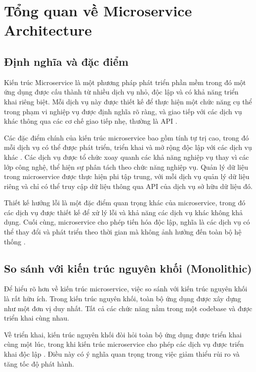 \section{Tổng quan về Microservice Architecture}

\subsection{Định nghĩa và đặc điểm}
Kiến trúc Microservice là một phương pháp phát triển phần mềm trong đó một ứng
dụng được cấu thành từ nhiều dịch vụ nhỏ, độc lập và có khả năng triển khai
riêng biệt. Mỗi dịch vụ này được thiết kế để thực hiện một chức năng cụ thể
trong phạm vi nghiệp vụ được định nghĩa rõ ràng, và giao tiếp với các dịch vụ
khác thông qua các cơ chế giao tiếp nhẹ, thường là API \cite{fowler2014}.

Các đặc điểm chính của kiến trúc microservice bao gồm tính tự trị cao, trong đó mỗi dịch vụ có thể được phát triển, triển khai và mở rộng độc lập với các dịch vụ khác \cite{newman2015}. Các dịch vụ được tổ chức xoay quanh các khả năng
nghiệp vụ thay vì các lớp công nghệ, thể hiện sự phân tách theo chức năng
nghiệp vụ. Quản lý dữ liệu trong microservice được thực hiện phi tập trung, với
mỗi dịch vụ quản lý dữ liệu riêng và chỉ có thể truy cập dữ liệu thông qua API
của dịch vụ sở hữu dữ liệu đó.

Thiết kế hướng lỗi là một đặc điểm quan trọng khác của microservice, trong đó
các dịch vụ được thiết kế để xử lý lỗi và khả năng các dịch vụ khác không khả
dụng. Cuối cùng, microservice cho phép tiến hóa độc lập, nghĩa là các dịch vụ
có thể thay đổi và phát triển theo thời gian mà không ảnh hưởng đến toàn bộ hệ
thống \cite{richardson2019}.

\subsection{So sánh với kiến trúc nguyên khối (Monolithic)}
Để hiểu rõ hơn về kiến trúc microservice, việc so sánh với kiến trúc nguyên khối là rất hữu ích. Trong kiến trúc nguyên khối, toàn bộ ứng dụng được xây dựng như một đơn vị duy nhất. Tất cả các chức năng nằm trong một codebase và được triển khai cùng nhau.

Về triển khai, kiến trúc nguyên khối đòi hỏi toàn bộ ứng dụng được triển khai
cùng một lúc, trong khi kiến trúc microservice cho phép các dịch vụ được triển
khai độc lập \cite{newman2015}. Điều này có ý nghĩa quan trọng trong việc giảm thiểu rủi ro và tăng tốc độ phát hành.

